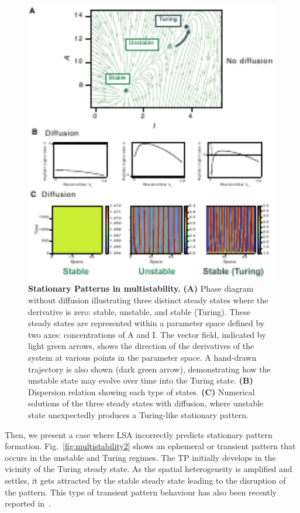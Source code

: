 \begin{figure}[H] %
    \centering
    \begin{adjustbox}{center}
        \includegraphics[width=1\textwidth]{chapters/Chapter 1/multistability1} %
    \end{adjustbox}
    \caption{\textbf{Stationary Patterns in multistability.} \textbf{(A)} Phase diagram without diffusion illustrating three distinct steady states where the derivative is zero: stable, unstable, and stable (Turing). These steady states are represented within a parameter space defined by two axes: concentrations of A and I. The vector field, indicated by light green arrows, shows the direction of the derivatives of the system at various points in the parameter space. A hand-drawn trajectory is also shown (dark green arrow), demonstrating how the unstable state may evolve over time into the Turing state. \textbf{(B)} Dispersion relation showing each type of states. \textbf{(C)} Numerical solutions of the three steady states with diffusion, where unstable state unexpectedly produces a Turing-like stationary pattern. }
    \label{fig:multistability1} %
\end{figure}
Then, we present a case where LSA incorrectly predicts stationary pattern formation.
Fig.~\ref{fig:multistability2} shows an ephemeral or transient pattern that occurs in the unstable and Turing regimes.
The TP initially develops in the vicinity of the Turing steady state.
As the spatial heterogeneity is amplified and settles, it gets attracted by the stable steady state leading to the disruption of the pattern.
This type of transient pattern behaviour has also been recently reported in~\cite{Krause2023}.

